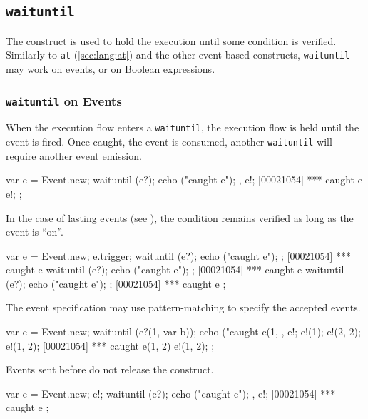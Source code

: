 \subsection{\lstinline{waituntil}}
\label{sec:lang:waituntil}

The  construct is used to hold the execution until some
condition is verified.  Similarly to \lstinline{at} (\autoref{sec:lang:at})
and the other event-based constructs, \lstinline{waituntil} may work on
events, or on Boolean expressions.

\subsubsection{\lstinline{waituntil} on Events}

When the execution flow enters a \lstinline{waituntil}, the execution
flow is held until the event is fired.  Once caught, the event is
consumed, another \lstinline{waituntil} will require another event
emission.

\begin{urbiscript}
{
  var e = Event.new;
  {
    waituntil (e?);
    echo ("caught e");
  },
  e!;
[00021054] *** caught e
  e!;
};
\end{urbiscript}

In the case of lasting events (see ), the
condition remains verified as long as the event is ``on''.

\begin{urbiscript}
{
  var e = Event.new;
  e.trigger;
  {
    waituntil (e?);
    echo ("caught e");
  };
[00021054] *** caught e
  {
    waituntil (e?);
    echo ("caught e");
  };
[00021054] *** caught e
  {
    waituntil (e?);
    echo ("caught e");
  };
[00021054] *** caught e
};
\end{urbiscript}

The event specification may use pattern-matching to specify the
accepted events.

\begin{urbiscript}
{
  var e = Event.new;
  {
    waituntil (e?(1, var b));
    echo ("caught e(1, %
  },
  e!;
  e!(1);
  e!(2, 2);
  e!(1, 2);
[00021054] *** caught e(1, 2)
  e!(1, 2);
};
\end{urbiscript}

Events sent before do not release the construct.

\begin{urbiscript}
{
  var e = Event.new;
  e!;
  {
    waituntil (e?);
    echo ("caught e");
  },
  e!;
[00021054] *** caught e
};
\end{urbiscript}

